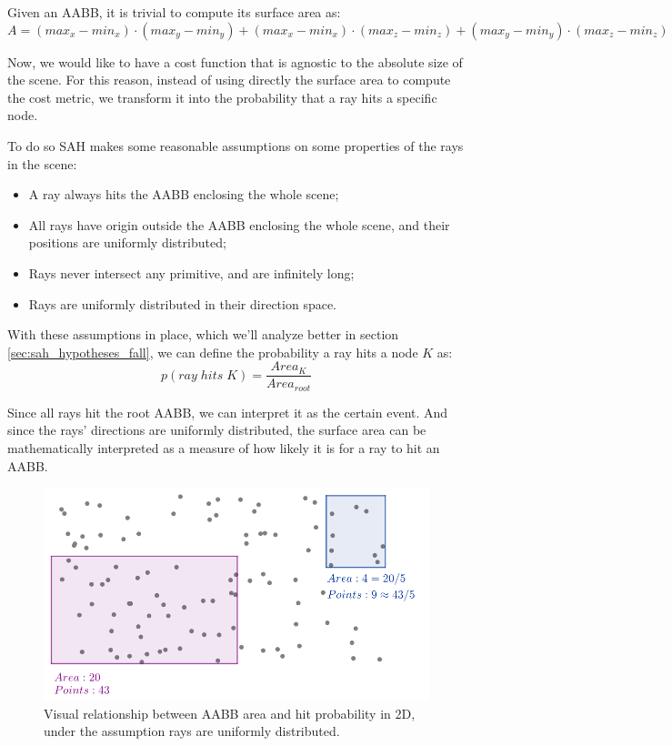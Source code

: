 \documentclass{PoliMi_MasterThesis}
\begin{document}
Given an AABB, it is trivial to compute its surface area as: 
$$A=(max_x-min_x)\cdot (max_y-min_y) + (max_x-min_x)\cdot (max_z-min_z) + (max_y-min_y)\cdot (max_z-min_z)$$

Now, we would like to have a cost function that is agnostic to the absolute size of the scene. For this reason, instead of using directly the surface area to compute the cost metric, we transform it into the probability that a ray hits a specific node.

To do so SAH makes some reasonable assumptions on some properties of the rays in the scene:
\begin{itemize}
	\item A ray always hits the AABB enclosing the whole scene;
	\item All rays have origin outside the AABB enclosing the whole scene, and their positions are uniformly distributed;
	\item Rays never intersect any primitive, and are infinitely long;
	\item Rays are uniformly distributed in their direction space.
\end{itemize}

With these assumptions in place, which we'll analyze better in section \ref{sec:sah_hypotheses_fall}, we can define the probability a ray hits a node $K$ as:
$$p(ray\; hits\; K) = \frac{Area_K}{Area_{root}}$$

Since all rays hit the root AABB, we can interpret it as the certain event. And since the rays' directions are uniformly distributed, the surface area can be mathematically interpreted as a measure of how likely it is for a ray to hit an AABB.

\begin{figure}[H]
    \centering
    \includegraphics[width=\textwidth*\real{0.7}]{Images/area_prob_visualization.png}
    \caption{Visual relationship between AABB area and hit probability in 2D, under the assumption rays are uniformly distributed.}
    \label{fig:area_probability_visual}
\end{figure}
\end{document}
